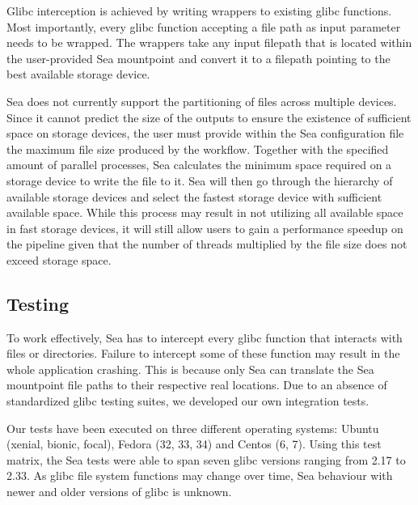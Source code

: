 \documentclass[10pt,journal,compsoc]{IEEEtran}
\newcommand{\todo}[1]{\marginpar{\parbox{18mm}{\flushleft\tiny\color{red}\textbf{TODO}:
#1}}}
\begin{document}
Glibc interception is achieved by writing wrappers to existing glibc functions.
Most importantly, every glibc function accepting a file path as input parameter needs to be
wrapped. The wrappers take any input filepath that is located within the
user-provided Sea mountpoint and convert it to a filepath pointing to the best
available storage device.

Sea does not currently support the partitioning of files across multiple
devices. Since it cannot predict the size of the outputs to ensure the existence
of sufficient space on storage devices, the user must provide within the Sea
configuration file the maximum file size produced by the workflow. Together with
the specified amount of parallel processes, Sea calculates the minimum space
required on a storage device to write the file to it.
Sea will then go through the hierarchy of available storage devices and select
the fastest storage device with sufficient available space. While this process
may result in not utilizing all available space in fast storage devices, it will
still allow users to gain a performance speedup on the pipeline given that the
number of threads multiplied by the file size does not exceed storage space.

\subsection{Testing}
To work effectively, Sea has to intercept every glibc function that interacts
with files or directories. Failure to intercept some of these function may
result in the whole application crashing. This is because only Sea can translate
the Sea mountpoint file paths to their respective real locations. Due to an
absence of standardized glibc testing suites, we developed our own integration
tests.

Our tests have been executed on three different operating systems: Ubuntu
(xenial, bionic, focal), Fedora (32, 33, 34) and Centos (6, 7). Using this test
matrix, the Sea tests were able to span seven glibc versions ranging from 2.17
to 2.33. As glibc file system functions may change over time, Sea behaviour with
newer and older versions of glibc is unknown. 
\end{document}
